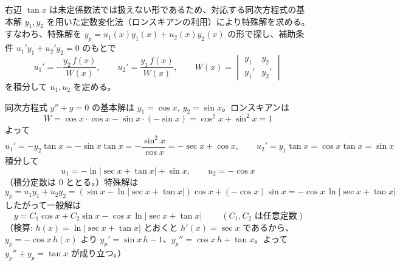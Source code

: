 
右辺 $\tan x$ は未定係数法では扱えない形であるため、対応する同次方程式の基本解 $y_{1}, y_{2}$ を用いた定数変化法（ロンスキアンの利用）により特殊解を求める。すなわち、特殊解を $y_{p} = u_{1}(x)y_{1}(x) + u_{2}(x)y_{2}(x)$ の形で探し、補助条件 $u_{1}'y_{1} + u_{2}'y_{2} = 0$ のもとで
\[
u_{1}' = -\frac{y_{2}\,f(x)}{W(x)}, \qquad u_{2}' = \frac{y_{1}\,f(x)}{W(x)}, \qquad W(x) = \begin{vmatrix} y_{1} & y_{2} \\ y_{1}' & y_{2}' \end{vmatrix}
\]
を積分して $u_{1}, u_{2}$ を定める。

同次方程式 $y''+y=0$ の基本解は $y_{1}=\cos x,\ y_{2}=\sin x$。ロンスキアンは
\[
W = \cos x\cdot\cos x - \sin x\cdot(-\sin x) = \cos^{2}x+\sin^{2}x = 1
\]
よって
\[
u_{1}' = -y_{2}\tan x = -\sin x\tan x = -\frac{\sin^{2}x}{\cos x} = -\sec x + \cos x,
\qquad
u_{2}' = y_{1}\tan x = \cos x\tan x = \sin x
\]
積分して
\[
u_{1} = -\ln|\sec x+\tan x| + \sin x, \qquad u_{2} = -\cos x
\]
（積分定数は $0$ ととる。）特殊解は
\[
y_{p} = u_{1}y_{1}+u_{2}y_{2}
= \left(\sin x - \ln|\sec x+\tan x|\right)\cos x + (-\cos x)\sin x
= -\cos x\,\ln|\sec x+\tan x|
\]
したがって一般解は
\[
\boxed{\; y = C_{1}\cos x + C_{2}\sin x - \cos x\,\ln|\sec x+\tan x| \;}
\qquad (C_{1}, C_{2}\text{ は任意定数})
\]
（検算: $h(x)=\ln|\sec x+\tan x|$ とおくと $h'(x)=\sec x$ であるから、$y_{p}=-\cos x\,h(x)$ より $y_{p}'=\sin x\,h-1$、$y_{p}''=\cos x\,h+\tan x$。よって $y_{p}''+y_{p}=\tan x$ が成り立つ。）
